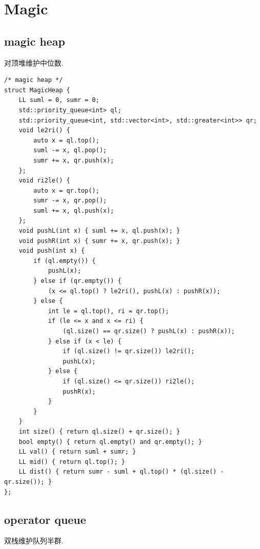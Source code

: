 \documentclass[UTF8, a4paper, titlepage, twoside]{ctexart}
\begin{document}
\newpage
\section{ Magic }
\subsection{ magic heap }

对顶堆维护中位数.

\begin{lstlisting}[style=cpp]    
/* magic heap */
struct MagicHeap {
    LL suml = 0, sumr = 0;
    std::priority_queue<int> ql;
    std::priority_queue<int, std::vector<int>, std::greater<int>> qr;
    void le2ri() {
        auto x = ql.top();
        suml -= x, ql.pop();
        sumr += x, qr.push(x);
    };
    void ri2le() {
        auto x = qr.top();
        sumr -= x, qr.pop();
        suml += x, ql.push(x);
    };
    void pushL(int x) { suml += x, ql.push(x); }
    void pushR(int x) { sumr += x, qr.push(x); }
    void push(int x) {
        if (ql.empty()) {
            pushL(x);
        } else if (qr.empty()) {
            (x <= ql.top() ? le2ri(), pushL(x) : pushR(x));
        } else {
            int le = ql.top(), ri = qr.top();
            if (le <= x and x <= ri) {
                (ql.size() == qr.size() ? pushL(x) : pushR(x));
            } else if (x < le) {
                if (ql.size() != qr.size()) le2ri();
                pushL(x);
            } else {
                if (ql.size() <= qr.size()) ri2le();
                pushR(x);
            }
        }
    }
    int size() { return ql.size() + qr.size(); }
    bool empty() { return ql.empty() and qr.empty(); }
    LL val() { return suml + sumr; }
    LL mid() { return ql.top(); }
    LL dist() { return sumr - suml + ql.top() * (ql.size() - qr.size()); }
};
\end{lstlisting}

\subsection{ operator queue }

双栈维护队列半群.
\end{document}

